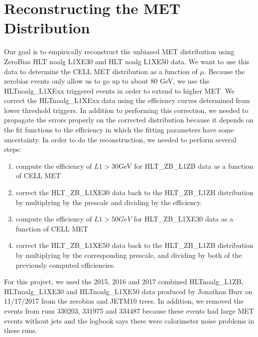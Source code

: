 \section{Reconstructing the MET Distribution}
Our goal is to empirically reconstruct the unbiased MET distribution using ZeroBias HLT noalg L1XE30 and HLT noalg L1XE50 data. 
We want to use this data to determine the CELL MET distribution as a function of $\mu$.
Because the zerobias events only allow us to go up to about 80 GeV, we use the HLTnoalg_L1XExx triggered events in order to extend to higher MET.
We correct the HLTnoalg_L1XExx data using the efficiency curves determined from lower threshold triggers.
In addition to performing this correction, we needed to propagate the errors properly on the corrected distribution because it depends on the fit functions to the efficiency in which the fitting parameters have some uncertainty. 
In order to do the reconstruction, we needed to perform several steps:
\begin{enumerate}
		\item compute the efficiency of $L1>30$GeV for HLT_ZB_L1ZB data as a function of CELL MET
		\item correct the HLT_ZB_L1XE30 data back to the HLT_ZB_L1ZB distribution by multiplying by the prescale and dividing by the efficiency. 
		\item compute the efficiency of $L1>50GeV$ for HLT_ZB_L1XE30 data as a function of CELL MET
		\item correct the HLT_ZB_L1XE50 data back to the HLT_ZB_L1ZB distribution by multiplying by the corresponding prescale, and dividing by both of the previously computed efficiencies. 
\end{enumerate}
For this project, we used the 2015, 2016 and 2017 combined HLTnoalg_L1ZB, HLTnoalg_L1XE30 and HLTnoalg_L1XE50 data produced by Jonathan Burr on 11/17/2017 from the zerobias and JETM10 trees.
In addition, we removed the events from runs 330203, 331975 and 334487 because these events had large MET events without jets and the logbook says there were calorimeter noise problems in these runs. 
